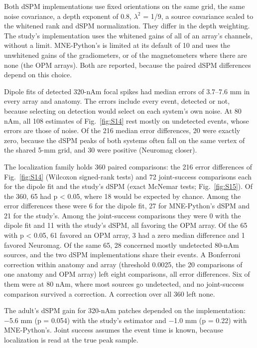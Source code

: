 \documentclass[preprint,12pt,authoryear,a4paper]{elsarticle}
\begin{document}
Both dSPM implementations use fixed orientations on the same grid, the same noise covariance, a depth exponent of 0.8, $\lambda^{2}$ = 1/9, a source covariance scaled to the whitened rank and dSPM normalization. They differ in the depth weighting. The study's implementation uses the whitened gains of all of an array's channels, without a limit. MNE-Python's is limited at its default of 10 and uses the unwhitened gains of the gradiometers, or of the magnetometers where there are none (the OPM arrays). Both are reported, because the paired dSPM differences depend on this choice.

Dipole fits of detected 320-nAm focal spikes had median errors of 3.7–7.6 mm in every array and anatomy. The errors include every event, detected or not, because selecting on detection would select on each system's own noise. At 80 nAm, all 108 estimates of Fig.~\ref{fig:S14} rest mostly on undetected events, whose errors are those of noise. Of the 216 median error differences, 20 were exactly zero, because the dSPM peaks of both systems often fall on the same vertex of the shared 5-mm grid, and 30 were positive (Neuromag closer).

The localization family holds 360 paired comparisons: the 216 error differences of Fig.~\ref{fig:S14} (Wilcoxon signed-rank tests) and 72 joint-success comparisons each for the dipole fit and the study's dSPM (exact McNemar tests; Fig.~\ref{fig:S15}). Of the 360, 65 had p < 0.05, where 18 would be expected by chance. Among the error differences these were 6 for the dipole fit, 27 for MNE-Python's dSPM and 21 for the study's. Among the joint-success comparisons they were 0 with the dipole fit and 11 with the study's dSPM, all favoring the OPM array. Of the 65 with p < 0.05, 61 favored an OPM array, 3 had a zero median difference and 1 favored Neuromag. Of the same 65, 28 concerned mostly undetected 80-nAm sources, and the two dSPM implementations share their events. A Bonferroni correction within anatomy and array (threshold 0.0025, the 20 comparisons of one anatomy and OPM array) left eight comparisons, all error differences. Six of them were at 80 nAm, where most sources go undetected, and no joint-success comparison survived a correction. A correction over all 360 left none.

The adult's dSPM gain for 320-nAm patches depended on the implementation: −5.6 mm (p = 0.054) with the study's estimator and −1.0 mm (p = 0.22) with MNE-Python's. Joint success assumes the event time is known, because localization is read at the true peak sample.
\end{document}
